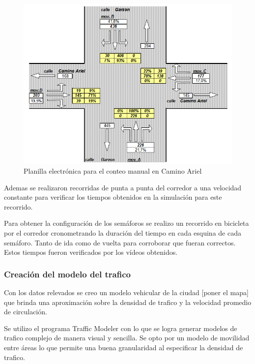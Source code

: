 \begin{figure}[H]
\centering
\includegraphics[width=0.7\linewidth]{Figures/conteo_hoja}
\caption{Planilla electrónica para el conteo manual en Camino Ariel}
\label{fig:conteo_hoja}
\end{figure}


Ademas se realizaron recorridas de punta a punta del corredor a una velocidad constante para verificar los tiempos obtenidos en la simulación para este recorrido.

Para obtener la configuración de los semáforos se realizo un recorrido en bicicleta por el corredor cronometrando la duración del tiempo en cada esquina de cada semáforo. Tanto de ida como de vuelta para corroborar que fueran correctos. Estos tiempos fueron verificados por los vídeos obtenidos.


\newpage
\subsubsection{Creación del modelo del trafico}

Con los datos relevados se creo un modelo vehicular de la ciudad [poner el mapa] que brinda una aproximación sobre la densidad de trafico y la velocidad promedio de circulación.

Se utilizo el programa Traffic Modeler \citep{TrafficModeler} con lo que se logra generar modelos de trafico complejo de manera visual y sencilla. Se opto por un modelo de movilidad entre áreas lo que permite una buena granularidad al especificar la densidad de trafico.


